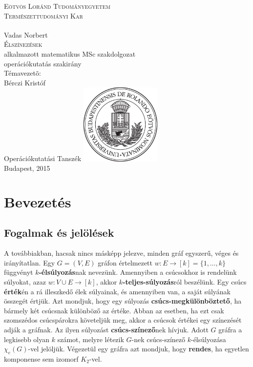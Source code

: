 \documentclass[12pt, a4paper]{report}
\theoremstyle{remark}
\theoremstyle{definition}
\begin{document}

\begin{titlepage}
\begin{center}
{\huge \textsc{Eötvös Loránd Tudományegyetem \\ Természettudományi Kar \\}}
\hrulefill \\[2.5cm]
{\huge Vadas Norbert} \\[0.7cm]
{\Huge \textsc{Élszínezések}} \\[0.7cm]
alkalmazott matematikus MSc szakdolgozat \\[0.1cm]
operációkutatás szakirány \\[2.2cm]
{\large Témavezetõ:} \\[0.4cm]
{\Large Bérczi Kristóf} \\[0.3cm] 
{\Large Operációkutatási Tanszék}
\vfill
\includegraphics[width=0.3\textwidth]{./images/elte_cimer_ff} \\[0.5cm]
{\large Budapest, 2015}
\end{center}
\end{titlepage}

\tableofcontents

\chapter{Bevezetés} 

\section{Fogalmak és jelölések}
A továbbiakban, hacsak nincs másképp jelezve, minden gráf egyszerű, véges és irányítatlan. Egy $G = (V, E)$ gráfon értelmezett $w: E \rightarrow [k] = \lbrace 1, \ldots, k \rbrace$ függvényt \textbf{$k$-élsúlyozás}nak nevezünk. Amennyiben a csúcsokhoz is rendelünk súlyokat, azaz $w: V \cup E \rightarrow [k]$, akkor \textbf{$k$-teljes-súlyozás}ról beszélünk. Egy csúcs \textbf{érték}én a rá illeszkedő élek súlyainak, és amennyiben van, a saját súlyának összegét értjük. Azt mondjuk, hogy egy súlyozás \textbf{csúcs-megkülönböztető}, ha bármely két csúcsnak különböző az értéke. Abban az esetben, ha ezt csak szomszédos csúcspárokra követeljük meg, akkor a csúcsok értékei egy színezését adják a gráfnak. Az ilyen súlyozást \textbf{csúcs-színező}nek hívjuk. Adott $G$ gráfra a legkisebb olyan $k$ számot, melyre létezik $G$-nek csúcs-színező $k$-élsúlyozása $\chi_e(G)$-vel jelöljük. Végezetül egy gráfra azt mondjuk, hogy \textbf{rendes}, ha egyetlen komponense sem izomorf $K_2$-vel.
\end{document}
